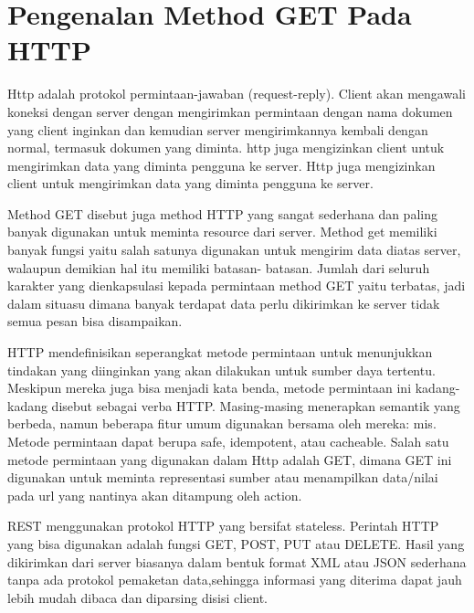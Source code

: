 
\section{Pengenalan Method GET Pada HTTP}
Http adalah protokol permintaan-jawaban (request-reply). Client akan mengawali koneksi dengan server dengan mengirimkan permintaan 
dengan nama dokumen yang client inginkan dan kemudian server mengirimkannya kembali dengan normal, termasuk dokumen yang diminta. http 
juga mengizinkan client untuk mengirimkan data yang diminta pengguna ke server. Http juga mengizinkan client untuk mengirimkan data 
yang diminta pengguna ke server. 

Method GET disebut juga method HTTP yang sangat sederhana dan paling banyak digunakan untuk meminta resource dari server. Method get 
memiliki banyak fungsi yaitu salah satunya digunakan untuk mengirim data diatas server, walaupun demikian hal itu memiliki batasan-
batasan. Jumlah dari seluruh karakter yang dienkapsulasi kepada permintaan method GET yaitu terbatas, jadi dalam situasu dimana banyak 
terdapat data perlu dikirimkan ke server tidak semua pesan bisa disampaikan. 

HTTP mendefinisikan seperangkat metode permintaan untuk menunjukkan tindakan yang diinginkan yang akan dilakukan untuk sumber daya 
tertentu.
Meskipun mereka juga bisa menjadi kata benda, metode permintaan ini kadang-kadang disebut sebagai verba HTTP. Masing-masing menerapkan 
semantik yang berbeda, namun beberapa fitur umum digunakan bersama oleh mereka: mis. Metode permintaan dapat berupa safe, idempotent, 
atau cacheable. Salah satu metode permintaan yang digunakan dalam Http adalah GET, dimana GET ini digunakan untuk meminta representasi 
sumber atau menampilkan data/nilai pada url yang nantinya akan ditampung oleh action.

REST menggunakan protokol HTTP yang bersifat stateless. Perintah HTTP yang bisa digunakan adalah fungsi GET, POST, PUT atau 
DELETE. Hasil yang dikirimkan dari server biasanya dalam bentuk format XML atau JSON sederhana tanpa ada protokol pemaketan  
data,sehingga informasi yang diterima dapat jauh lebih mudah dibaca dan diparsing disisi client.

